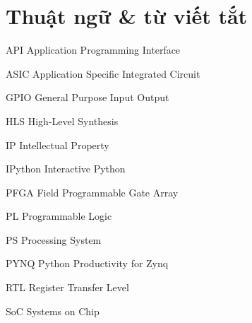 \newcommand{\abbrlabel}[1]{\makebox[3cm][l]{\textbf{#1}\ \dotfill}}
\newenvironment{abbreviations}{\begin{list}{}{\renewcommand{\makelabel}{\abbrlabel}}}{\end{list}}

\chapter*{Thuật ngữ \& từ viết tắt}
\thispagestyle{empty}
\pagestyle{empty}
\vspace{1.0cm}
\begin{abbreviations}
	\item[API] Application Programming Interface
	\item[ASIC] Application Specific Integrated Circuit
	\item[GPIO] General Purpose Input Output
	\item[HLS] High-Level Synthesis
	\item[IP] Intellectual Property
	\item[IPython] Interactive Python
	\item[PFGA] Field Programmable Gate Array
	\item[PL] Programmable Logic
	\item[PS] Processing System
	\item[PYNQ] Python Productivity for Zynq
	\item[RTL] Register Transfer Level
	\item[SoC] Systems on Chip
\end{abbreviations}